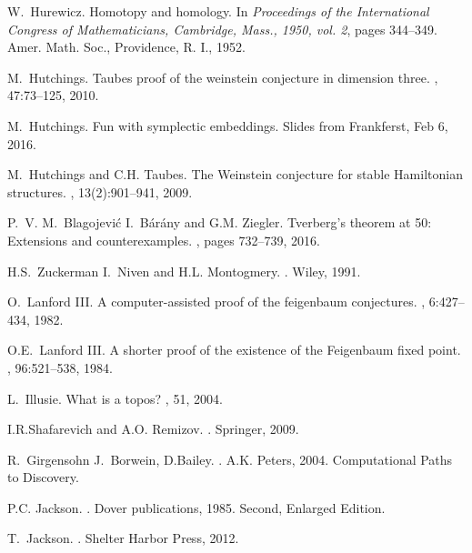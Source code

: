 \documentclass[12pt]{amsart}
\newcounter{example}    \def\example#1{ \item \fontsize{12}{15} \selectfont #1 \fontsize{12}{15} \selectfont }
\begin{document}
\begin{thebibliography}{100}
W.~Hurewicz.
\newblock Homotopy and homology.
\newblock In {\em Proceedings of the {I}nternational {C}ongress of
  {M}athematicians, {C}ambridge, {M}ass., 1950, vol. 2}, pages 344--349. Amer.
  Math. Soc., Providence, R. I., 1952.

M.~Hutchings.
\newblock Taubes proof of the weinstein conjecture in dimension three.
, 47:73--125, 2010.

M.~Hutchings.
\newblock Fun with symplectic embeddings.
\newblock Slides from Frankferst, Feb 6, 2016.

M.~Hutchings and C.H. Taubes.
\newblock The {W}einstein conjecture for stable {H}amiltonian structures.
, 13(2):901--941, 2009.

P.~V. M.~Blagojevi{\'c} I.~B{\'a}r{\'a}ny and G.M. Ziegler.
\newblock Tverberg's theorem at 50: Extensions and counterexamples.
, pages 732--739, 2016.

H.S.~Zuckerman I.~Niven and H.L. Montogmery.
.
\newblock Wiley, 1991.

O.~Lanford III.
\newblock A computer-assisted proof of the feigenbaum conjectures.
, 6:427--434, 1982.

O.E.~Lanford III.
\newblock A shorter proof of the existence of the {F}eigenbaum fixed point.
, 96:521--538, 1984.

L.~Illusie.
\newblock What is a topos?
, 51, 2004.

I.R.Shafarevich and A.O. Remizov.
.
\newblock Springer, 2009.

R.~Girgensohn J.~Borwein, D.Bailey.
.
\newblock A.K. Peters, 2004.
\newblock Computational Paths to Discovery.

P.C. Jackson.
.
\newblock Dover publications, 1985.
\newblock Second, Enlarged Edition.

T.~Jackson.
.
\newblock Shelter Harbor Press, 2012.


\end{thebibliography}
\end{document}
